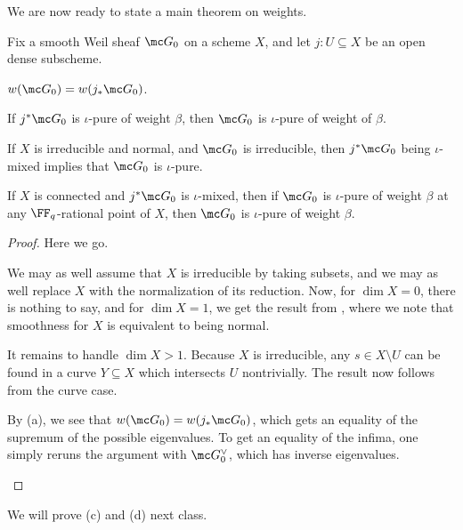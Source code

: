 \documentclass[../notes.tex]{subfiles}
\begin{document}
We are now ready to state a main theorem on weights.
\begin{theorem}
	Fix a smooth Weil sheaf $\mc G_0$ on a scheme $X$, and let $j\colon U\subseteq X$ be an open dense subscheme.
	\begin{listalph}
		\item $w(\mc G_0)=w(j_*\mc G_0)$.
		\item If $j^*\mc G_0$ is $\iota$-pure of weight $\beta$, then $\mc G_0$ is $\iota$-pure of weight of $\beta$.
		\item If $X$ is irreducible and normal, and $\mc G_0$ is irreducible, then $j^*\mc G_0$ being $\iota$-mixed implies that $\mc G_0$ is $\iota$-pure.
		\item If $X$ is connected and $j^*\mc G_0$ is $\iota$-mixed, then if $\mc G_0$ is $\iota$-pure of weight $\beta$ at any $\FF_q$-rational point of $X$, then $\mc G_0$ is $\iota$-pure of weight $\beta$.
	\end{listalph}
\end{theorem}
\begin{proof}
	Here we go.
	\begin{listalph}
		\item We may as well assume that $X$ is irreducible by taking subsets, and we may as well replace $X$ with the normalization of its reduction. Now, for $\dim X=0$, there is nothing to say, and for $\dim X=1$, we get the result from , where we note that smoothness for $X$ is equivalent to being normal.

		It remains to handle $\dim X>1$. Because $X$ is irreducible, any $s\in X\setminus U$ can be found in a curve $Y\subseteq X$ which intersects $U$ nontrivially. The result now follows from the curve case.

		\item By (a), we see that $w(\mc G_0)=w(j_*\mc G_0)$, which gets an equality of the supremum of the possible eigenvalues. To get an equality of the infima, one simply reruns the argument with $\mc G_0^\lor$, which has inverse eigenvalues.
		\qedhere
	\end{listalph}
\end{proof}
We will prove (c) and (d) next class.
\end{document}
